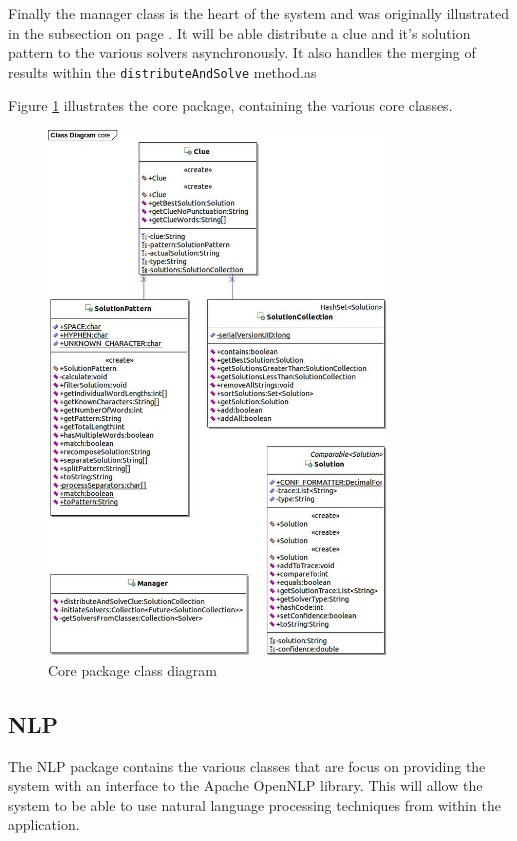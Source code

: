 Finally the manager class is the heart of the system and was originally 
illustrated in the subsection  on page 
\pageref{sub:solving_a_clue}. It will be able distribute a clue and it's 
solution pattern to the various solvers asynchronously. It also handles the 
merging of results within the \texttt{distributeAndSolve} method.as

Figure \ref{fig:core_package} illustrates the core package, containing the 
various core classes.

\begin{figure}[H]
  \centering
  \includegraphics[width=0.8\textwidth]{class/core.jpg}
  \caption{Core package class diagram}
  \label{fig:core_package}
\end{figure}


\subsection{NLP}
\label{sub:nlp}

The NLP package contains the various classes that are focus on providing the 
system with an interface to the Apache OpenNLP library. This will allow the 
system to be able to use natural language processing techniques from within the 
application.

